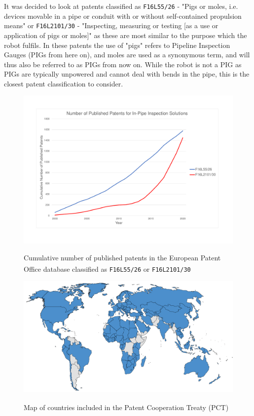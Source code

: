 \documentclass[11pt]{article}		%
\newlength{\imageheight}	 %
\newcommand{\supercite}[1]{\textsuperscript{\cite{#1}}}		%
\begin{document}
		It was decided to look at patents classified as \verb|F16L55/26| - "Pigs or moles, i.e. devices movable in a pipe or conduit with or without self-contained propulsion means" or \verb|F16L2101/30| - "Inspecting, measuring or testing [as a use or application of pigs or moles]" as these are most similar to the purpose which the robot fulfils.
		In these patents the use of "pigs" refers to Pipeline Inspection Gauges (PIGs from here on), and moles are used as a synonymous term, and will thus also be referred to as PIGs from now on.
		While the robot is not a PIG as PIGs are typically unpowered and cannot deal with bends in the pipe, this is the closest patent classification to consider.
		\begin{figure}[h]
			\centering
			\begin{multicols}{2}
				\includegraphics[height=\imageheight]{patentGraph}
				\caption{Cumulative number of published patents in the European Patent Office database classified as \texttt{F16L55/26}\supercite{patent26} or \texttt{F16L2101/30}\supercite{patent30} }
				\label{patentGraph}
				\columnbreak
				\includegraphics[height=\imageheight]{pctMap}
				\caption{Map of countries included in the Patent Cooperation Treaty (PCT)\supercite{pct2020states}}
				\label{pctMap}
			\end{multicols}
		\end{figure}
\end{document}
